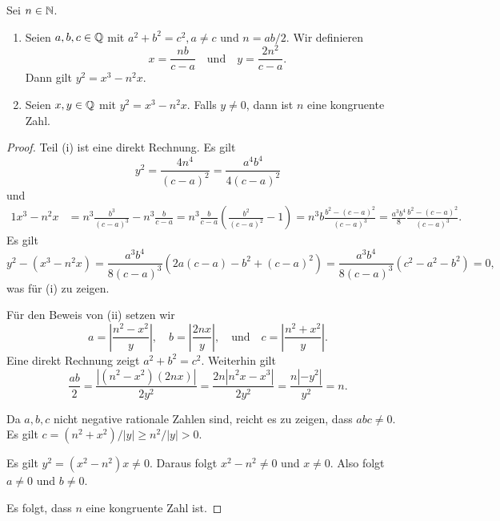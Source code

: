 \begin{lemma} \label{lem:congruentelliptic}
  Sei $n\in{\mathbb{N}}$. 
  \begin{enumerate}
  \item
  Seien $a,b,c\in {\mathbb{Q}}$ mit $a^2+b^2=c^2,a\not=c$ und $n = ab/2$. Wir definieren
  \begin{equation*}
    x = \frac{nb}{c-a} \quad\text{und}\quad
    y = \frac{2n^2}{c-a}. 
  \end{equation*}
  Dann gilt $y^2 = x^3-n^2 x$.
  \item Seien $x,y\in{\mathbb{Q}}$ mit $y^2 = x^3-n^2x$. Falls $y\not=0$, dann
    ist $n$ eine kongruente Zahl.
  \end{enumerate}
\end{lemma}
\begin{proof}
  Teil (i) ist eine direkt Rechnung. Es gilt
  \begin{equation*}
    y^2 = \frac{4n^4}{(c-a)^2} = \frac{a^4b^4}{4(c-a)^2} 
  \end{equation*}
  und
  \begin{alignat*}1
    x^3 -n^2 x &= n^3 \frac{b^3}{(c-a)^3} - n^3 \frac{b}{c-a}
    = n^3 \frac{b}{c-a}\left(\frac{b^2}{(c-a)^2}-1\right)
    = n^3 b\frac{b^2-(c-a)^2}{(c-a)^3}
    = \frac{a^3b^4}{8}\frac{b^2-(c-a)^2}{(c-a)^3}.
  \end{alignat*}
  Es gilt  $$
  y^2 - (x^3-n^2x) = \frac{a^3b^4}{8(c-a)^3} \left(
    2a(c-a) - b^2+(c-a)^2\right) =
  \frac{a^3b^4}{8(c-a)^3} (c^2-a^2-b^2)=0,
  $$
  was für (i)  zu zeigen.

  Für den Beweis von (ii) setzen wir
  \begin{equation*}
    a = \left|\frac{n^2-x^2}{y}\right|, \quad
    b = \left|\frac{2nx}{y}\right|, \quad\text{und}\quad
    c = \left|\frac{n^2+x^2}{y}\right|. 
  \end{equation*}
  Eine direkt Rechnung zeigt $a^2+b^2=c^2$. Weiterhin gilt
  \begin{equation*}
    \frac{ab}{2} = \frac{|(n^2-x^2)(2nx)|}{2y^2} = \frac{2n |n^2x -
      x^3|}{2y^2} = \frac{n |-y^2|}{y^2} = n.
  \end{equation*}

  Da $a,b,c$ nicht negative rationale Zahlen sind, reicht es zu
  zeigen, dass $abc\not=0$. Es gilt $c = (n^2+x^2)/|y| \ge n^2/|y|>0$.

  Es gilt $y^2 = (x^2-n^2)x\not=0$. Daraus folgt 
  $x^2-n^2\not=0$ und $x\not=0$. Also folgt $a\not=0$ und $b\not=0$. 

  Es folgt, dass $n$ eine kongruente Zahl ist. 
\end{proof}

